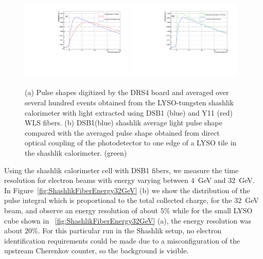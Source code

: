%


\begin{figure}[h] \centering
%
\includegraphics[width=0.48\textwidth]{figs/FiberPulsesZoomY11DSB1} 
%
\includegraphics[width=0.48\textwidth]{figs/FiberPulsesZoomDirectDSB1} 
%
\caption{\small (a) Pulse shapes digitized by the DRS4 board and averaged over several hundred events 
obtained from the LYSO-tungsten shashlik calorimeter with light extracted using
DSB1 (blue) and Y11 (red) WLS fibers. 
 (b)  DSB1(blue) shashlik average light pulse shape compared with 
the averaged pulse shape obtained from direct optical coupling of the photodetector to one edge of  a LYSO tile in the shashlik calorimeter.  (green)} 
\label{fig:FiberPulseComparison}
\end{figure}


Using the shashlik calorimeter cell with DSB1 fibers, we measure the time resolution
for electron beams with energy varying between $4$~GeV and $32$~GeV.
In Figure~\ref{fig:ShashlikFiberEnergy32GeV} (b) we show the distribution
of the pulse integral which is proportional to the total collected charge,
for the $32$~GeV beam, and observe an energy resolution of about $5\%$
while for the small LYSO cube shown in ~\ref{fig:ShashlikFiberEnergy32GeV} (a),  the energy 
resolution was about 20\%. For this particular run in the Shashlik setup, no electron identification 
requirements could be made due to a misconfiguration of the upstream Cherenkov counter, 
so the background is visible.


